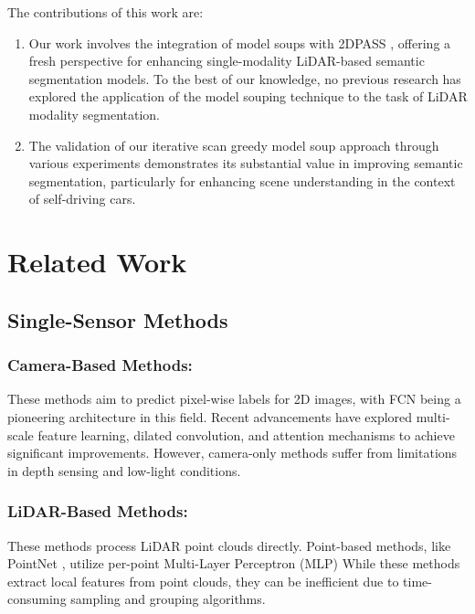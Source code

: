 \documentclass[10pt,twocolumn,letterpaper]{article}
\begin{document}
The contributions of this work are: \\ 
  \begin{enumerate}
\item Our work involves the integration of model soups with 2DPASS \cite{yan20222dpass}, offering a fresh perspective for enhancing single-modality LiDAR-based semantic segmentation models. To the best of our knowledge, no previous research has explored the application of the model souping technique to the task of LiDAR modality segmentation.

\item The validation of our iterative scan greedy model soup approach through various experiments demonstrates its substantial value in improving semantic segmentation, particularly for enhancing scene understanding in the context of self-driving cars.
\end{enumerate}




\section{Related Work}
\subsection{ Single-Sensor Methods
}

\subsubsection{Camera-Based Methods:}
These methods aim to predict pixel-wise labels for 2D images, with FCN \cite{long2015fully} being a pioneering architecture in this field. Recent advancements have explored multi-scale feature learning, dilated convolution, and attention mechanisms to achieve significant improvements. However, camera-only methods suffer from limitations in depth sensing and low-light conditions.\cite{he2016deep,chen2017rethinking,chen2017deeplab,lin2016efficient,zhao2017pyramid,wang2018understanding,huang2019ccnet,yuan2018ocnet}

\subsubsection{LiDAR-Based Methods:}
These methods process LiDAR point clouds directly. Point-based methods, like PointNet \cite{qi2016pointnet}, utilize per-point Multi-Layer Perceptron (MLP)\cite{rosenblatt1958perceptron} While these methods extract local features from point clouds, they can be inefficient due to time-consuming sampling and grouping algorithms.\cite{thomas2019kpconv,qi2017pointnet++,wang2019dynamic,PointConv,liu2019relation,Thomas_2019_ICCV,hua2018pointwise,yan2020pointasnl,zhao2021point,engel2021point,yan2020pointasnl,zhao2021point,engel2021point}
\end{document}
